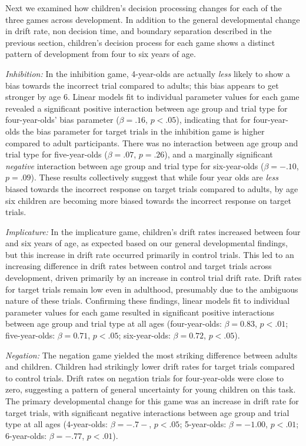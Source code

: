 \documentclass[10pt,letterpaper]{article}
\begin{document}
Next we examined how children's decision processing changes for each of the three games across development.  In addition to the general developmental change in drift rate, non decision time, and boundary separation described in the previous section, children's decision process for each game shows a distinct pattern of development from four to six years of age.  

\emph{Inhibition:} In the inhibition game, 4-year-olds are actually \emph{less} likely to show a bias towards the incorrect trial compared to adults; this bias appears to get stronger by age 6.  Linear models fit to individual parameter values for each game revealed a significant positive interaction between age group and trial type for four-year-olds' bias parameter ($\beta = .16$, $p< .05$), indicating that for four-year-olds the bias parameter for target trials in the inhibition game is higher compared to adult participants.  There was no interaction between age group and trial type for five-year-olds ($\beta = .07$, $p = .26$), and a marginally significant \emph{negative} interaction between age group and trial type for six-year-olds ($\beta = -.10$, $p = .09$).  These results collectively suggest that while four year olds are \emph{less} biased towards the incorrect response on target trials compared to adults, by age six children are becoming more biased towards the incorrect response on target trials.  

\emph{Implicature:} In the implicature game, children's drift rates increased between four and six years of age, as expected based on our general developmental findings, but this increase in drift rate occurred primarily in control trials.  This led to an increasing difference in drift rates between control and target trials across development, driven primarily by an increase in control trial drift rate.  Drift rates for target trials remain low even in adulthood, presumably due to the ambiguous nature of these trials.  Confirming these findings, linear models fit to individual parameter values for each game resulted in significant positive interactions between age group and trial type at all ages (four-year-olds: $\beta = 0.83$, $p <.01$; five-year-olds: $\beta = 0.71$, $p <.05$; six-year-olds: $\beta = 0.72$, $p <.05$).

\emph{Negation:}  The negation game yielded the most striking difference between adults and children.  Children had strikingly lower drift rates for target trials compared to control trials.  Drift rates on negation trials for four-year-olds were close to zero, suggesting a pattern of general uncertainty for young children on this task.  The primary developmental change for this game was an increase in drift rate for target trials, with significant negative interactions between age group and trial type at all ages (4-year-olds: $\beta = -.7-$, $p <.05$; 5-year-olds: $\beta = -1.00$, $p <.01$; 6-year-olds: $\beta = -.77$, $p <.01$).  
\end{document}
